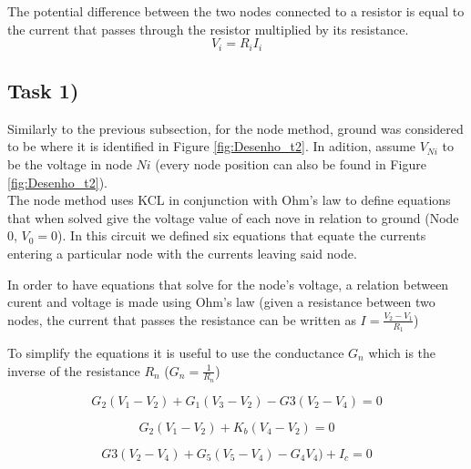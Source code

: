 The potential difference between the two nodes connected to a resistor is equal to the current that 
passes through the resistor multiplied by its resistance.
\begin{equation}
	V_i = R_iI_i
	\label{eq:ohm}
\end{equation}


\subsection{Task 1)}
\label{subsec:task1_a}


Similarly to the previous subsection, for the node method, ground was considered to be where it is identified in
Figure \ref{fig:Desenho_t2}. In adition, assume $V_{Ni}$ to be the voltage in node $Ni$ (every node position can
also be found in Figure \ref{fig:Desenho_t2}). \\

The node method uses KCL in conjunction with Ohm’s law to define equations that when solved give the voltage value 
of each nove in relation to ground (Node 0, $V_0 = 0$). In this circuit we defined six equations that equate the 
currents entering a particular node with the currents leaving said node. 

In order to have equations that solve for the node’s voltage, a relation between curent and voltage is made using 
Ohm’s law (given a resistance between two nodes, the current that passes the resistance can be written as 
$I=\frac{V_2-V_1}{R_1}$)

To simplify the equations it is useful to use the conductance $G_n$ which is the inverse of the resistance $R_n$ 
($G_n=\frac{1}{R_n}$)

\begin{equation}
	G_2(V_1-V_2)+G_1(V_3-V_2) - G3(V_2-V_4) = 0
	\label{}
\end{equation}

\begin{equation}
	G_2(V_1-V_2)+K_b(V_4-V_2) = 0
	\label{}
\end{equation}

\begin{equation}
	G3(V_2-V_4)+G_5(V_5-V_4)-G_4V_4)+I_c=0
	\label{}
\end{equation} 

